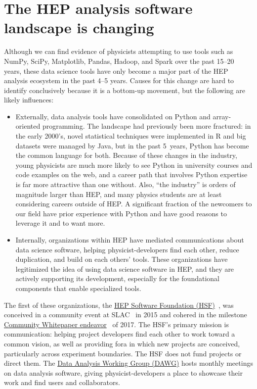 \documentclass[12pt,a4paper]{article}
\begin{document}
\section{The HEP analysis software landscape is changing}

Although we can find evidence of physicists attempting to use tools such as NumPy, SciPy, Matplotlib, Pandas, Hadoop, and Spark over the past 15--20 years, these data science tools have only become a major part of the HEP analysis ecosystem in the past 4--5 years. Causes for this change are hard to identify conclusively because it is a bottom-up movement, but the following are likely influences:

\begin{itemize}
\item Externally, data analysis tools have consolidated on Python and array-oriented programming. The landscape had previously been more fractured: in the early 2000's, novel statistical techniques were implemented in R and big datasets were managed by Java, but in the past 5~years, Python has become the common language for both. Because of these changes in the industry, young physicists are much more likely to see Python in university courses and code examples on the web, and a career path that involves Python expertise is far more attractive than one without. Also, ``the industry'' is orders of magnitude larger than HEP, and many physics students are at least considering careers outside of HEP. A significant fraction of the newcomers to our field have prior experience with Python and have good reasons to leverage it and to want more.

\item Internally, organizations within HEP have mediated communications about data science software, helping physicist-developers find each other, reduce duplication, and build on each others' tools. These organizations have legitimized the idea of using data science software in HEP, and they are actively supporting its development, especially for the foundational components that enable specialized tools.
\end{itemize}

The first of these organizations, the \href{https://hepsoftwarefoundation.org/}{HEP Software Foundation (HSF)}~\cite{HSF}, was conceived in a community event at SLAC~\cite{hsf-workshop-slac2015} in 2015 and cohered in the milestone \href{https://hepsoftwarefoundation.org/organization/cwp.html}{Community Whitepaper endeavor}~\cite{Albrecht2019} of 2017. The HSF's primary mission is communication: helping project developers find each other to work toward a common vision, as well as providing fora in which new projects are conceived, particularly across experiment boundaries. The HSF does not fund projects or direct them. The \href{https://hepsoftwarefoundation.org/workinggroups/dataanalysis.html}{Data Analysis Working Group (DAWG)} hosts monthly meetings on data analysis software, giving physicist-developers a place to showcase their work and find users and collaborators.
\end{document}
